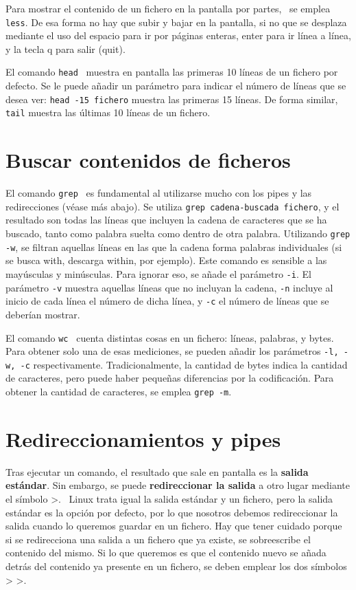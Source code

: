 \documentclass{config/apuntes}
\begin{document}
Para mostrar el contenido de un fichero en la pantalla por partes,  \ se emplea \texttt{less}. De esa forma no hay que subir y bajar en la pantalla, si no que se desplaza mediante el uso del espacio para ir por páginas enteras, enter para ir línea a línea, y la tecla q para salir (quit). 

El comando \texttt{head}  \ muestra en pantalla las primeras 10 líneas de un fichero por defecto. Se le puede añadir un parámetro para indicar el número de líneas que se desea ver: \texttt{head -15 fichero} muestra las primeras 15 líneas. De forma similar, \texttt{tail} muestra las últimas 10 líneas de un fichero.

\section{Buscar contenidos de ficheros}
El comando \texttt{grep}  \ es fundamental al utilizarse mucho con los pipes y las redirecciones (véase más abajo). Se utiliza \texttt{grep cadena-buscada fichero}, y el resultado son todas las líneas que incluyen la cadena de caracteres que se ha buscado, tanto como palabra suelta como dentro de otra palabra. Utilizando \texttt{grep -w}, se filtran aquellas líneas en las que la cadena forma palabras individuales (si se busca with, descarga within, por ejemplo). Este comando es sensible a las mayúsculas y minúsculas. Para ignorar eso, se añade el parámetro \texttt{-i}. El parámetro \texttt{-v} muestra aquellas líneas que no incluyan la cadena, \texttt{-n} incluye al inicio de cada línea el número de dicha línea, y \texttt{-c} el número de líneas que se deberían mostrar.

El comando \texttt{wc} \marginpar[\footnotesize wc] \ cuenta distintas cosas en un fichero: líneas, palabras, y bytes. Para obtener solo una de esas mediciones, se pueden añadir los parámetros \texttt{-l, -w, -c} respectivamente. Tradicionalmente, la cantidad de bytes indica la cantidad de caracteres, pero puede haber pequeñas diferencias por la codificación. Para obtener la cantidad de caracteres, se emplea \texttt{grep -m}.

\section{Redireccionamientos y pipes}
Tras ejecutar un comando, el resultado que sale en pantalla es la \textbf{salida estándar}. Sin embargo, se puede \textbf{redireccionar la salida} a otro lugar mediante el símbolo >. \marginpar[\footnotesize > \\ > >] \ Linux trata igual la salida estándar y un fichero, pero la salida estándar es la opción por defecto, por lo que nosotros debemos redireccionar la salida cuando lo queremos guardar en un fichero. Hay que tener cuidado porque si se redirecciona una salida a un fichero que ya existe, se sobreescribe el contenido del mismo. Si lo que queremos es que el contenido nuevo se añada detrás del contenido ya presente en un fichero, se deben emplear los dos símbolos > >. 
\end{document}
